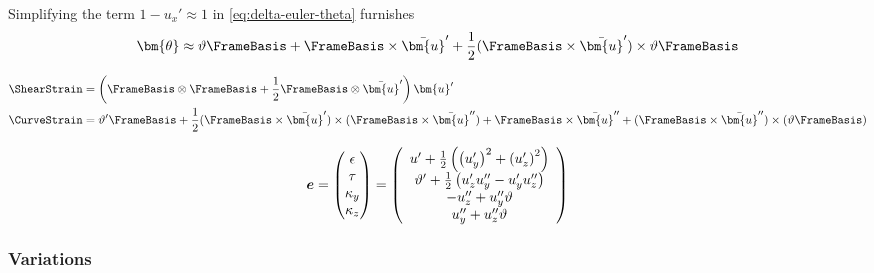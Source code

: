 Simplifying the term \(1-u_x' \approx 1\) in \cref{eq:delta-euler-theta} furnishes
\begin{equation}
\bm{\theta} \approx \vartheta \FrameBasis 
+ \FrameBasis\times\bar{\bm{u}}^{\prime} 
+ \frac{1}{2} (\FrameBasis\times\bar{\bm{u}}^{\prime}) \times \vartheta \FrameBasis
\label{eq:stiff-euler-theta}
\end{equation}

\begin{equation}
\begin{aligned}
\ShearStrain &= \left(\FrameBasis\otimes\FrameBasis + \frac{1}{2}\FrameBasis\otimes\bar{\bm{u}}^{\prime}\right)\bm{u}^{\prime} \\
\CurveStrain &= \vartheta^{\prime} \FrameBasis 
+ \frac{1}{2}(\FrameBasis\times\bar{\bm{u}}^{\prime})\times(\FrameBasis\times\bar{\bm{u}}^{\prime\prime}) 
+ \FrameBasis\times\bar{\bm{u}}^{\prime\prime} 
+ (\FrameBasis\times\bar{\bm{u}}^{\prime\prime})\times(\vartheta \FrameBasis)
\end{aligned}
\label{eq:stiff-euler-strain}
\end{equation}

\begin{equation}
\boldsymbol{e} = \begin{pmatrix}
\epsilon \\ 
\tau \\
\kappa_{\FrameYi} \\
\kappa_{\FrameZi} \\ 
\end{pmatrix}
=\left(\begin{array}{c}
u^{\prime} + \frac{1}{2}\left(\left(u_{\FrameYi}^{\prime}\right)^2+\left(u_{\FrameZi}^{\prime}\right)^2\right) \\ %
\vartheta^{\prime} +\frac{1}{2}\left(u_{z}^{\prime} u_{y}^{\prime\prime}-u_{y}^{\prime} u_{z}^{\prime\prime}\right)\\
-u_{\FrameZi}^{\prime \prime}+u_{\FrameYi}^{\prime \prime} \vartheta \\
u_{\FrameYi}^{\prime \prime}+u_{\FrameZi}^{\prime \prime} \vartheta \\
\end{array}\right)
\end{equation}

\subsubsection{Variations}

